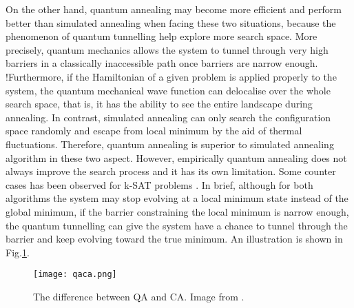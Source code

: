 \documentclass[twoside,a4paper,article]{combine}
\begin{document}
On the other hand, quantum annealing may become more efficient and perform better than simulated annealing when facing these two situations, because the phenomenon of quantum tunnelling help explore more search space. More precisely, quantum mechanics allows the system to tunnel through very high barriers in a classically inaccessible path once barriers are narrow enough. !Furthermore, if the Hamiltonian of a given problem is applied properly to the system, the quantum mechanical wave function can delocalise over the whole search space, that is, it has the ability to see the entire landscape during annealing. In contrast, simulated annealing can only search the configuration space randomly and escape from local minimum by the aid of thermal fluctuations. Therefore, quantum annealing is superior to simulated annealing algorithm in these two aspect. However, empirically quantum annealing does not always improve the search process and it has its own limitation. Some counter cases has been observed for k-SAT problems \cite{Battaglia2005}. In brief, although for both algorithms the system may stop evolving at a local minimum state instead of the global minimum, if the barrier constraining the local minimum is narrow enough, the quantum tunnelling can give the system have a chance to tunnel through the barrier and keep evolving toward the true minimum. An illustration is shown in Fig.\ref{diff_qa_ca}. \\ 

\begin{figure}[h]
	\centering
	\texttt{[image: qaca.png]}
	\caption{The difference between QA and CA. Image from \cite{Das2008}. }
	\label{diff_qa_ca}
\end{figure}



 
\end{document}
